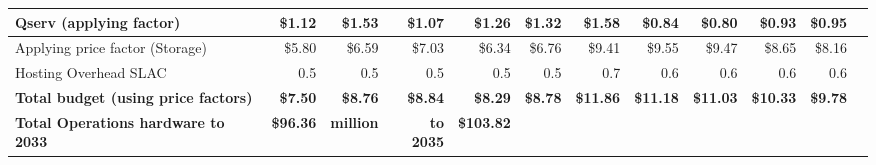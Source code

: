 \begin{longtable} { |p{}  |r  |r  |r  |r  |r  |r  |r  |r  |r  |r  |r |}
{Qserv (applying factor)}&{\$1.12}&{\$1.53}&{\$1.07}&{\$1.26}&{\$1.32}&{\$1.58}&{\$0.84}&{\$0.80}&{\$0.93}&{\$0.95} \\ \hline
{Applying price factor (Storage)}&{\$5.80}&{\$6.59}&{\$7.03}&{\$6.34}&{\$6.76}&{\$9.41}&{\$9.55}&{\$9.47}&{\$8.65}&{\$8.16} \\ \hline
{Hosting Overhead SLAC
}&{0.5}&{0.5}&{0.5}&{0.5}&{0.5}&{0.7}&{0.6}&{0.6}&{0.6}&{0.6} \\ \hline
\textbf{Total budget (using price factors)}&\textbf{\$7.50}&\textbf{\$8.76}&\textbf{\$8.84}&\textbf{\$8.29}&\textbf{\$8.78}&\textbf{\$11.86}&\textbf{\$11.18}&\textbf{\$11.03}&\textbf{\$10.33}&\textbf{\$9.78} \\ \hline
\textbf{Total Operations hardware to 2033}&\textbf{\$96.36}&\textbf{million}&\textbf{to 2035}&\textbf{\$103.82}&&&&&& \\ \hline
\end{longtable} \normalsize

